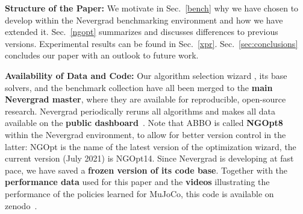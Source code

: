 {
\textbf{Structure of the Paper:} We motivate in Sec.~\ref{bench} why we have chosen to develop \ngoptq{} within the Nevergrad benchmarking environment and how we have extended it. Sec.~\ref{ngopt} summarizes \ngoptq{} and discusses differences to previous versions. Experimental results can be found in Sec.~\ref{xpr}. Sec.~\ref{sec:conclusions} concludes our paper with an outlook to future work.} 

{\textbf{Availability of Data and Code:} Our algorithm selection wizard \ngoptq{}, its base solvers, and the benchmark collection have all been merged to the \textbf{main Nevergrad master}, where they are available for reproducible, open-source research. Nevergrad periodically reruns all algorithms and makes all data available on the \textbf{public dashboard}~\cite{dash}. Note that ABBO is called \textbf{NGOpt8} within the Nevergrad environment, to allow for better version control in the latter: NGOpt is the name of the latest version of the optimization wizard, the current version (July 2021) is NGOpt14. Since Nevergrad is developing at fast pace, we have saved a \textbf{frozen version of its code base}. Together with the \textbf{performance data} used for this paper and the \textbf{videos} illustrating the performance of the policies learned for MuJoCo, this code is available on zenodo~\cite{zenodo}. }%


\def\papa{p{0.3\textwidth}}
\def\pupu{p{0.1\textwidth}}
\def\popo{p{0.055\textwidth}}

       
